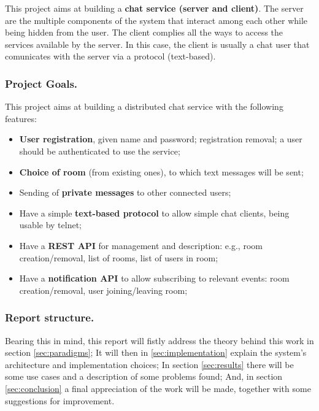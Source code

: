This project aims at building a \textbf{chat service (server and client)}. The server are the multiple components of the system that interact among each other while being hidden from the user. The client complies all the ways to access the services available by the server. In this case, the client is usually a chat user that comunicates with the server via a protocol (text-based).

\subsubsection{Project Goals.}
This project aims at building a distributed chat service with the following features:

\begin{itemize}
\item \textbf{User registration}, given name and password; registration removal; a user should be authenticated to use the service;
\item \textbf{Choice of room} (from existing ones), to which text messages will be sent;
\item Sending of \textbf{private messages} to other connected users;
\item Have a simple \textbf{text-based protocol} to allow simple chat clients, being usable by telnet;
\item Have a \textbf{REST API} for management and description: e.g., room creation/removal, list of rooms, list of users in room;
\item Have a \textbf{notification API} to allow subscribing to relevant events: room creation/removal, user joining/leaving room;
\end{itemize}

\subsubsection{Report structure.}
Bearing this in mind, this report will fistly address the theory behind this work in section \ref{sec:paradigms}; It will then in \ref{sec:implementation} explain the system's architecture and implementation choices; In section \ref{sec:results} there will be some use cases and a description of some problems found; And, in section \ref{sec:conclusion} a final appreciation of the work will be made, together with some suggestions for improvement.